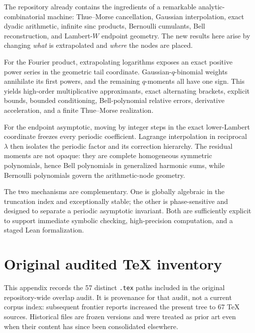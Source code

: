 \documentclass[11pt]{article}
\numberwithin{equation}{section}
\theoremstyle{definition}
\theoremstyle{remark}
\begin{document}
The repository already contains the ingredients of a remarkable analytic-combinatorial machine: Thue--Morse cancellation, Gaussian interpolation, exact dyadic arithmetic, infinite sinc products, Bernoulli cumulants, Bell reconstruction, and Lambert-$W$ endpoint geometry. The new results here arise by changing \emph{what} is extrapolated and \emph{where} the nodes are placed.

For the Fourier product, extrapolating logarithms exposes an exact positive power series in the geometric tail coordinate. Gaussian-$q$-binomial weights annihilate its first powers, and the remaining $q$-moments all have one sign. This yields high-order multiplicative approximants, exact alternating brackets, explicit bounds, bounded conditioning, Bell-polynomial relative errors, derivative acceleration, and a finite Thue--Morse realization.

For the endpoint asymptotic, moving by integer steps in the exact lower-Lambert coordinate freezes every periodic coefficient. Lagrange interpolation in reciprocal $\lambda$ then isolates the periodic factor and its correction hierarchy. The residual moments are not opaque: they are complete homogeneous symmetric polynomials, hence Bell polynomials in generalized harmonic sums, while Bernoulli polynomials govern the arithmetic-node geometry.

The two mechanisms are complementary. One is globally algebraic in the truncation index and exceptionally stable; the other is phase-sensitive and designed to separate a periodic asymptotic invariant. Both are sufficiently explicit to support immediate symbolic checking, high-precision computation, and a staged Lean formalization.

\appendix
\renewcommand*{\theHsection}{\arabic{part}.\arabic{section}}

\section{Original audited TeX inventory}
\label{p8:app:inventory}

This appendix records the 57 distinct \texttt{.tex} paths included in the original
repository-wide overlap audit.  It is provenance for that audit, not a current corpus
index: subsequent frontier reports increased the present tree to 67 TeX sources.
Historical files are frozen versions and were treated as prior art even when their content
has since been consolidated elsewhere.
\end{document}
